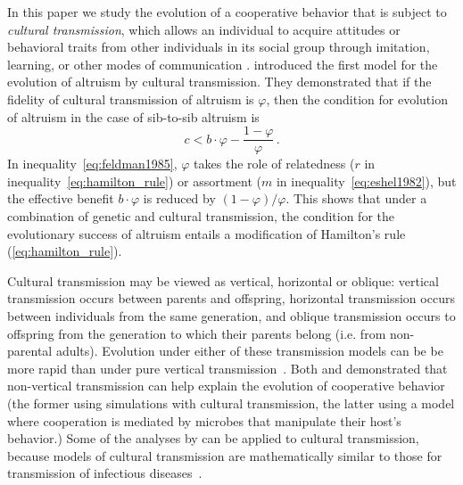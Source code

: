 \documentclass[12pt]{extarticle}
\begin{document}
In this paper we study the evolution of a cooperative behavior that is subject to \emph{cultural transmission}, which allows an individual to acquire attitudes or behavioral traits from other individuals in its social group through imitation, learning, or other modes of communication \citep{cavalli1981cultural,richerson2008not}.
\citet{feldman1985gene} introduced the first model for the evolution of altruism by cultural transmission.
They demonstrated that if the fidelity of cultural transmission of altruism is $\varphi$, then the condition for evolution of altruism in the case of sib-to-sib altruism is \citep[Eq.~16]{feldman1985gene}
\begin{equation} \label{eq:feldman1985}
c < b \cdot \varphi - \frac{1-\varphi}{\varphi} \,.
\end{equation}
In inequality~\ref{eq:feldman1985}, $\varphi$ takes the role of relatedness ($r$ in inequality~\ref{eq:hamilton_rule}) or assortment ($m$ in inequality~\ref{eq:eshel1982}), but the effective benefit $b\cdot \varphi$ is  reduced by $(1-\varphi)/\varphi$. This shows that under a combination of genetic and cultural transmission, the condition for the evolutionary success of altruism entails a modification of Hamilton's rule (\ref{eq:hamilton_rule}).

Cultural transmission may be  viewed as vertical, horizontal or oblique:  vertical transmission occurs between parents and offspring, horizontal transmission occurs between individuals from the same generation, and oblique transmission occurs  to offspring from the generation to which their parents belong (i.e. from non-parental adults). 
Evolution under either of these transmission models can be be more rapid than under pure vertical transmission~\citep{cavalli1981cultural,lycett2008questions,ram2018evolution}.
Both \citet{woodcock2006significance} and \citet{lewin2017microbes} demonstrated that non-vertical transmission can help explain the evolution of cooperative behavior (the former using simulations with cultural transmission, the latter using a model where cooperation is mediated by microbes that manipulate their host's behavior.) 
Some of the analyses by \citet{lewin2017microbes} can be applied to cultural transmission, because models of cultural transmission are mathematically similar to those for transmission of infectious diseases~\citep{cavalli1981cultural}.
\end{document}
